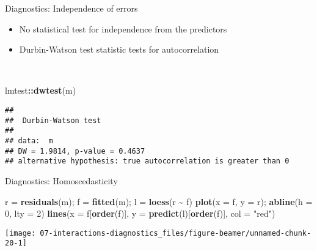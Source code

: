 \documentclass[
  ignorenonframetext,
]{beamer}
\newenvironment{Shaded}{\begin{snugshade}}{\end{snugshade}}
\newcommand{\AttributeTok}[1]{\textcolor[rgb]{0.13,0.29,0.53}{#1}}
\newcommand{\DecValTok}[1]{\textcolor[rgb]{0.00,0.00,0.81}{#1}}
\newcommand{\FunctionTok}[1]{\textcolor[rgb]{0.13,0.29,0.53}{\textbf{#1}}}
\newcommand{\NormalTok}[1]{#1}
\newcommand{\OtherTok}[1]{\textcolor[rgb]{0.56,0.35,0.01}{#1}}
\newcommand{\SpecialCharTok}[1]{\textcolor[rgb]{0.81,0.36,0.00}{\textbf{#1}}}
\newcommand{\StringTok}[1]{\textcolor[rgb]{0.31,0.60,0.02}{#1}}
\providecommand{\tightlist}{%
  \setlength{\itemsep}{0pt}\setlength{\parskip}{0pt}}
\newcommand{\setsep}{\setlength{\itemsep}{3pt}}
\newcommand{\setskip}{\setlength{\parskip}{3pt}}
\renewcommand{\tightlist}{\setsep\setskip}
\begin{document}
\begin{frame}[fragile]{Diagnostics: Independence of errors}
\protect\hypertarget{diagnostics-independence-of-errors}{}
\pause

\begin{itemize}[<+->]
\tightlist
\item
  No statistical test for independence from the predictors
\item
  Durbin-Watson test statistic tests for autocorrelation
\end{itemize}

\pause

~

\small

\begin{Shaded}
\begin{Highlighting}[]
\NormalTok{lmtest}\SpecialCharTok{::}\FunctionTok{dwtest}\NormalTok{(m)}
\end{Highlighting}
\end{Shaded}

\begin{verbatim}
## 
##  Durbin-Watson test
## 
## data:  m
## DW = 1.9814, p-value = 0.4637
## alternative hypothesis: true autocorrelation is greater than 0
\end{verbatim}

\normalsize
\end{frame}

\begin{frame}[fragile]{Diagnostics: Homoscedasticity}
\protect\hypertarget{diagnostics-homoscedasticity}{}
\begin{Shaded}
\begin{Highlighting}[]
\NormalTok{r }\OtherTok{=} \FunctionTok{residuals}\NormalTok{(m); f }\OtherTok{=} \FunctionTok{fitted}\NormalTok{(m); l }\OtherTok{=} \FunctionTok{loess}\NormalTok{(r }\SpecialCharTok{\textasciitilde{}}\NormalTok{ f)}
\FunctionTok{plot}\NormalTok{(}\AttributeTok{x =}\NormalTok{ f, }\AttributeTok{y =}\NormalTok{ r); }\FunctionTok{abline}\NormalTok{(}\AttributeTok{h =} \DecValTok{0}\NormalTok{, }\AttributeTok{lty =} \DecValTok{2}\NormalTok{)}
\FunctionTok{lines}\NormalTok{(}\AttributeTok{x =}\NormalTok{ f[}\FunctionTok{order}\NormalTok{(f)], }\AttributeTok{y =} \FunctionTok{predict}\NormalTok{(l)[}\FunctionTok{order}\NormalTok{(f)], }\AttributeTok{col =} \StringTok{"red"}\NormalTok{)}
\end{Highlighting}
\end{Shaded}

\texttt{[image: 07-interactions-diagnostics\_files/figure-beamer/unnamed-chunk-20-1]}
\end{frame}
\end{document}
